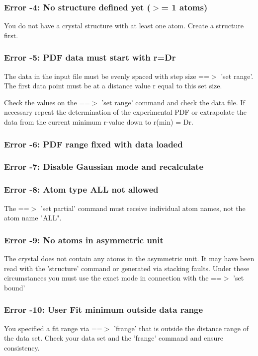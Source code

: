 \subsubsection{Error -4: No structure defined yet ($> $= 1 atoms)}
\par
You do not have a crystal structure with at least one atom. 
Create a structure first. 
\subsubsection{Error -5: PDF data must start with r=Dr}
\par
The data in the input file must be evenly spaced with step size 
==$> $ 'set range'. 
The first data point must be at a distance value r equal to this 
set size. 
\par
Check the values on the ==$> $ 'set range' command and check the 
data file. If necessary repeat the determination of the experimental 
PDF or extrapolate the data from the current minimum r-value down 
to r(min) = Dr. 
\subsubsection{Error -6: PDF range fixed with data loaded}
\subsubsection{Error -7: Disable Gaussian mode and recalculate}
\subsubsection{Error -8: Atom type ALL not allowed}
\par
The ==$> $ 'set partial' command must receive individual atom names, not 
the atom name "ALL". 
\subsubsection{Error -9: No atoms in asymmetric unit}
\par
The crystal does not contain any atoms in the asymmetric unit. It may 
have been read with the 'structure' command or generated via stacking 
faults. 
Under these circumstances you must use the exact mode in connection 
with the ==$> $ 'set bound' 
\subsubsection{Error -10: User Fit minimum outside data range}
\par
You specified a fit range via ==$> $ 'frange' that is outside the 
distance range of the data set. Check your data set and the 'frange' 
command and ensure consistency. 
